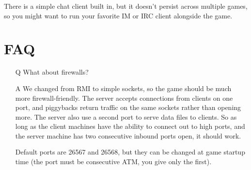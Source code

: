 \documentclass{article}
\begin{document}
There is a simple chat client built in, but it doesn't persist across
multiple games, so you might want to run your favorite IM or IRC client
alongside the game.

\section{FAQ}

\begin{itemize}

\item[Q] What about firewalls?

\item[A] We changed from RMI to simple sockets, so the game should be
much more firewall-friendly.  The server accepts connections from 
clients on one port, and piggybacks return traffic on the same sockets
rather than opening more.  The server also use a second port to serve
data files to clients. So as long as the client machines have the
ability to connect out to high ports, and the server machine has two
consecutive inbound ports open, it should work.

Default ports are 26567 and 26568, but they can be changed at game
startup time (the port must be consecutive ATM, you give only the
first).

\end{itemize}
\end{document}
